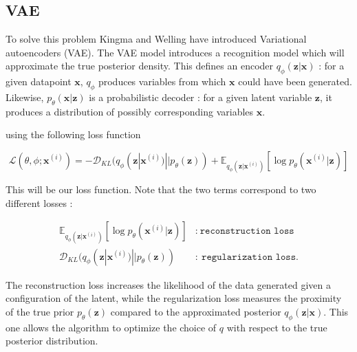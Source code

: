 \documentclass{article}
\begin{document}
\subsection{VAE}




To solve this problem Kingma and Welling \cite{kingmaAutoEncodingVariationalBayes2022} have introduced Variational autoencoders (VAE). The VAE model introduces a recognition model which will approximate the true posterior density. This defines an encoder $q_\phi(\textbf{z} | \textbf{x})$ : for a given datapoint $\textbf{x}$, $q_\phi$ produces variables from which $\textbf{x}$ could have been generated. Likewise, $p_\theta(\textbf{x}|\textbf{z})$ is a probabilistic decoder : for a given latent variable $\textbf{z}$, it produces a distribution of possibly corresponding variables $\textbf{x}$.

using the following loss function 


\begin{equation}\label{loss1}
    \mathcal{L}(\theta, \phi ; \textbf{x}^{(i)}) = -\mathcal{D}_{KL}(q_\phi(\textbf{z} | \textbf{x}^{(i)}) || p_\theta(\textbf{z})) + \mathbb{E}_{q_\phi(\textbf{z} | \textbf{x}^{(i)})} [\log p_\theta(\textbf{x}^{(i)} | \textbf{z})]
\end{equation}


This will be our loss function. Note that the two terms correspond to two different losses :

\begin{align*}
    \mathbb{E}_{q_\phi(\textbf{z} | \textbf{x}^{(i)})} [\log p_\theta(\textbf{x}^{(i)} | \textbf{z})] &:\ \texttt{reconstruction loss} \\
    \mathcal{D}_{KL}(q_\phi(\textbf{z} | \textbf{x}^{(i)}) || p_\theta(\textbf{z})) &:\ \texttt{regularization loss}.
\end{align*}

The reconstruction loss increases the likelihood of the data generated given a configuration of the latent, while the regularization loss measures the proximity of the true prior $p_\theta (\textbf{z})$ compared to the approximated posterior $q_\phi(\textbf{z}|\textbf{x})$. This one allows the algorithm to optimize the choice of $q$ with respect to the true posterior distribution. 
\end{document}
